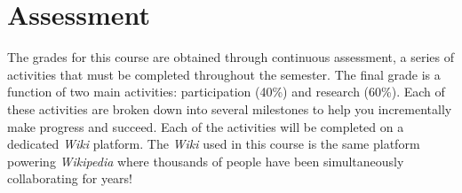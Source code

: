 \documentclass{article}
\begin{document}
\section*{Assessment}

The grades for this course are obtained through continuous assessment, a series of activities that must be completed throughout the semester. The final grade is a function of two main activities: participation (40\%) and research (60\%). Each of these activities are broken down into several milestones to help you incrementally make progress and succeed. Each of the activities will be completed on a dedicated \textit{Wiki} platform. The \textit{Wiki} used in this course is the same platform powering \textit{Wikipedia} where thousands of people have been simultaneously collaborating for years!



\nocite{brady2019challenge, burrell2020society, caren2020contemporary, jerit2020political, zhuravskaya2020political}
\end{document}
